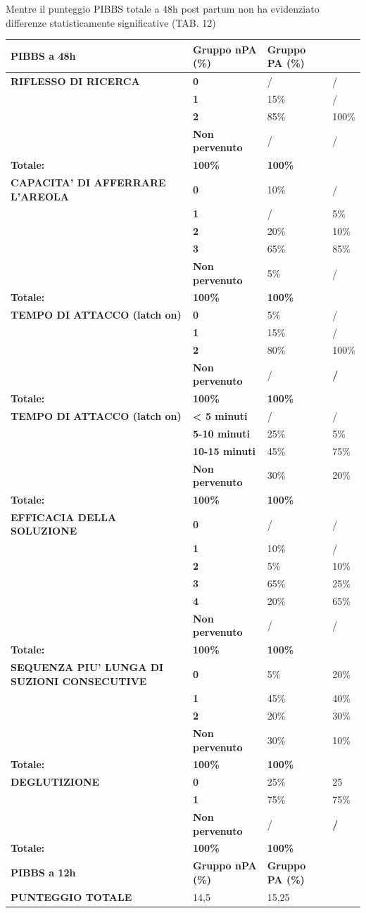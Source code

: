 \documentclass[]{article}
\begin{document}
Mentre il punteggio PIBBS totale a 48h post partum non ha evidenziato
differenze statisticamente significative (TAB. 12)

\begin{longtable}[]{@{}llll@{}}
\toprule
\textbf{PIBBS a 48h} & \textbf{Gruppo nPA (\%)} & \textbf{Gruppo PA
(\%)} &\tabularnewline
\midrule
\endhead
\textbf{RIFLESSO DI RICERCA} & \textbf{0} & / & /\tabularnewline
& \textbf{1} & 15\% & /\tabularnewline
& \textbf{2} & 85\% & 100\%\tabularnewline
& \textbf{Non pervenuto} & / & /\tabularnewline
\textbf{Totale:} & \textbf{100\%} & \textbf{100\%} &\tabularnewline
\textbf{CAPACITA' DI AFFERRARE L'AREOLA} & \textbf{0} & 10\% &
/\tabularnewline
& \textbf{1} & / & 5\%\tabularnewline
& \textbf{2} & 20\% & 10\%\tabularnewline
& \textbf{3} & 65\% & 85\%\tabularnewline
& \textbf{Non pervenuto} & 5\% & /\tabularnewline
\textbf{Totale:} & \textbf{100\%} & \textbf{100\%} &\tabularnewline
\textbf{TEMPO DI ATTACCO (latch on)} & \textbf{0} & 5\% &
/\tabularnewline
& \textbf{1} & 15\% & /\tabularnewline
& \textbf{2} & 80\% & 100\%\tabularnewline
& \textbf{Non pervenuto} & / & \textbf{/}\tabularnewline
\textbf{Totale:} & \textbf{100\%} & \textbf{100\%} &\tabularnewline
\textbf{TEMPO DI ATTACCO (latch on)} & \textbf{\textless{} 5 minuti} & /
& /\tabularnewline
& \textbf{5-10 minuti} & 25\% & 5\%\tabularnewline
& \textbf{10-15 minuti} & 45\% & 75\%\tabularnewline
& \textbf{Non pervenuto} & 30\% & 20\%\tabularnewline
\textbf{Totale:} & \textbf{100\%} & \textbf{100\%} &\tabularnewline
\textbf{EFFICACIA DELLA SOLUZIONE} & \textbf{0} & / & /\tabularnewline
& \textbf{1} & 10\% & /\tabularnewline
& \textbf{2} & 5\% & 10\%\tabularnewline
& \textbf{3} & 65\% & 25\%\tabularnewline
& \textbf{4} & 20\% & 65\%\tabularnewline
& \textbf{Non pervenuto} & / & /\tabularnewline
\textbf{Totale:} & \textbf{100\%} & \textbf{100\%} &\tabularnewline
\textbf{SEQUENZA PIU' LUNGA DI SUZIONI CONSECUTIVE} & \textbf{0} & 5\% &
20\%\tabularnewline
& \textbf{1} & 45\% & 40\%\tabularnewline
& \textbf{2} & 20\% & 30\%\tabularnewline
& \textbf{Non pervenuto} & 30\% & 10\%\tabularnewline
\textbf{Totale:} & \textbf{100\%} & \textbf{100\%} &\tabularnewline
\textbf{DEGLUTIZIONE} & \textbf{0} & 25\% & 25\tabularnewline
& \textbf{1} & 75\% & 75\%\tabularnewline
& \textbf{Non pervenuto} & / & \textbf{/}\tabularnewline
\textbf{Totale:} & \textbf{100\%} & \textbf{100\%} &\tabularnewline
\textbf{PIBBS a 12h} & \textbf{Gruppo nPA (\%)} & \textbf{Gruppo PA
(\%)} &\tabularnewline
\textbf{PUNTEGGIO TOTALE} & 14,5 & 15,25 &\tabularnewline
\bottomrule
\end{longtable}
\end{document}

